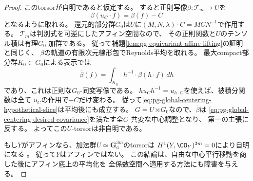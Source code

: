 \begin{proof}
このtorsorが自明であると仮定する。
すると正則写像$\beta:\mathcal T_m\to U$を
\begin{equation}
 \beta(u_C\cdot f)=\beta(f)-C
 \label{eq:pg-global-centering-hypothetical-slice}
\end{equation}
となるように取れる。
還元的部分群$G_0$は$U$に$(M,N,\lambda)\cdot C=MCN^{-1}$で作用する。
$\mathcal T_m$は判別式を可逆にしたアフィン空間なので、
その正則関数と$U$のテンソル積は有理$G_0$-加群である。
従って補題\ref{lem:pg-equivariant-affine-lifting}の証明と同じく、
$\beta$の軌道の有限次元線形包でReynolds平均を取れる。
最大compact部分群$K_0\subset G_0$による表示では
\begin{equation}
 \overline\beta(f)
 =\int_{K_0} h^{-1}\!\cdot\beta(h\cdot f)\,dh
 \label{eq:pg-global-centering-reynolds-slice}
\end{equation}
であり、これは正則な$G_0$-同変写像である。
$h u_C h^{-1}=u_{h\cdot C}$を使えば、被積分関数は全て
$u_C$の作用で$-C$だけ変わる。
従って\eqref{eq:pg-global-centering-hypothetical-slice}は平均後にも成立する。
$G=U\rtimes G_0$なので、$\overline\beta$は
\eqref{eq:pg-global-centering-desired-covariance}を満たす全$G$-共変な中心調整となり、
第一の主張に反する。
よってこの$U$-torsorは非自明である。

もし$Y$がアフィンなら、加法群$U\simeq\mathbf G_a^{3m}$のtorsorは
$H^1(Y,\OO_Y)^{3m}=0$により自明になる
\cite[Theorem~59.22.4, Tag~\texttt{03OY}]{PStacks}。
従って$Y$はアフィンではない。
この結論は、自由な中心平行移動を商した後にアフィン底上の平均化を
全係数空間へ適用する方法にも障害を与える。
\end{proof}
